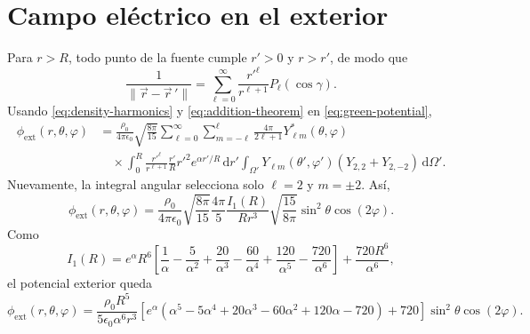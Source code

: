 \documentclass[a4paper,12pt]{article}
\newcommand{\dd}{\,\mathrm{d}}
\begin{document}
\section{Campo eléctrico en el exterior}

\begin{center}
\end{center}

Para $r>R$, todo punto de la fuente cumple $r'>0$ y $r>r'$, de modo que
\[
\frac{1}{\lVert\vec r-\vec r\,'\rVert}
=\sum_{\ell=0}^{\infty}\frac{r'^\ell}{r^{\ell+1}}P_\ell(\cos\gamma).
\]
Usando \eqref{eq:density-harmonics} y \eqref{eq:addition-theorem} en \eqref{eq:green-potential},
\begin{align*}
\phi_{\mathrm{ext}}(r,\theta,\varphi)
&=\frac{\rho_0}{4\pi\epsilon_0}\sqrt{\frac{8\pi}{15}}
\sum_{\ell=0}^{\infty}\sum_{m=-\ell}^{\ell}\frac{4\pi}{2\ell+1}Y_{\ell m}^*(\theta,\varphi)\\
&\quad\times \int_0^R\frac{r'^\ell}{r^{\ell+1}}\frac{r'}{R}r'^2e^{\alpha r'/R}\dd r'
\int_{\Omega'}Y_{\ell m}(\theta',\varphi')\left(Y_{2,2}+Y_{2,-2}\right)\dd\Omega'.
\end{align*}
Nuevamente, la integral angular selecciona solo $\ell=2$ y $m=\pm2$. Así,
\[
\phi_{\mathrm{ext}}(r,\theta,\varphi)
=\frac{\rho_0}{4\pi\epsilon_0}\sqrt{\frac{8\pi}{15}}\frac{4\pi}{5}
\frac{I_1(R)}{Rr^3}\sqrt{\frac{15}{8\pi}}\sin^2\theta\cos(2\varphi).
\]
Como
\[
I_1(R)=e^\alpha R^6\left[\frac{1}{\alpha}-\frac{5}{\alpha^2}+\frac{20}{\alpha^3}
-\frac{60}{\alpha^4}+\frac{120}{\alpha^5}-\frac{720}{\alpha^6}\right]
+\frac{720R^6}{\alpha^6},
\]
el potencial exterior queda
\begin{equation}
\label{eq:phi-ext}
\boxed{
\phi_{\mathrm{ext}}(r,\theta,\varphi)
=\frac{\rho_0R^5}{5\epsilon_0\alpha^6r^3}
\left[e^\alpha(\alpha^5-5\alpha^4+20\alpha^3-60\alpha^2+120\alpha-720)+720\right]
\sin^2\theta\cos(2\varphi).}
\end{equation}
\end{document}
